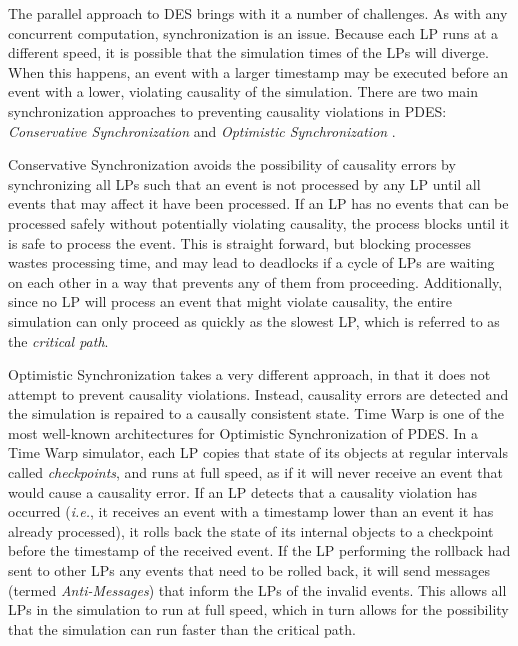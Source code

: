 \documentclass[11pt]{book}
\begin{document}
The parallel approach to DES brings with it a number of challenges. As with any concurrent computation, synchronization is an issue. Because each LP runs at a different speed, it is possible that the simulation times of the LPs will diverge. When this happens, an event with a larger timestamp may be executed before an event with a lower, violating causality of the simulation. There are two main synchronization approaches to preventing causality violations in PDES: \emph{Conservative Synchronization} \cite{bryant-79,chandy-81} and \emph{Optimistic Synchronization} \cite{fujimoto-90,jefferson-85}.

Conservative Synchronization avoids the possibility of causality errors by synchronizing all LPs such that an event is not processed by any LP until all events that may affect it have been processed. If an LP has no events that can be processed safely without potentially violating causality, the process blocks until it is safe to process the event. This is straight forward, but blocking processes wastes processing time, and may lead to deadlocks if a cycle of LPs are waiting on each other in a way that prevents any of them from proceeding. Additionally, since no LP will process an event that might violate causality, the entire simulation can only proceed as quickly as the slowest LP, which is referred to as the \emph{critical path}.

Optimistic Synchronization takes a very different approach, in that it does not attempt to prevent causality violations. Instead, causality errors are detected and the simulation is repaired to a causally consistent state. Time Warp \cite{jefferson-85} is one of the most well-known architectures for Optimistic Synchronization of PDES. In a Time Warp simulator, each LP copies that state of its objects at regular intervals called \emph{checkpoints}, and runs at full speed, as if it will never receive an event that would cause a causality error. If an LP detects that a causality violation has occurred (\emph{i.e.}, it receives an event with a timestamp lower than an event it has already processed), it rolls back the state of its internal objects to a checkpoint before the timestamp of the received event. If the LP performing the rollback had sent to other LPs any events that need to be rolled back, it will send messages (termed \emph{Anti-Messages}) that inform the LPs of the invalid events. This allows all LPs in the simulation to run at full speed, which in turn allows for the possibility that the simulation can run faster than the critical path.
\end{document}

